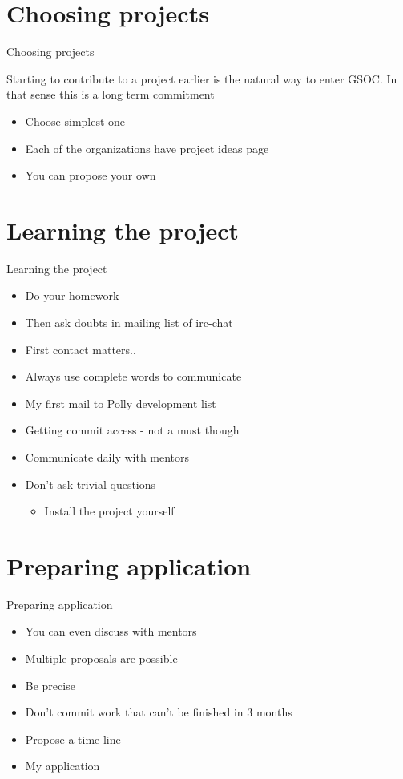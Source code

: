 \documentclass{beamer}
\begin{document}
\section{Choosing projects}
\begin{frame}{Choosing projects}
\begin{block}
{Starting to contribute to a project earlier is the natural way to enter GSOC.
In that sense this is a long term commitment}
\end{block}
\begin{itemize}
\item Choose simplest one
\item Each of the organizations have project ideas page
\item You can propose your own
\end{itemize}
\end{frame}

\section{Learning the project}
\begin{frame}{Learning the project}
\begin{itemize}
\item Do your homework
\pause
\item Then ask doubts in mailing list of irc-chat
\pause
\item First contact matters..
\pause
\item Always use complete words to communicate
\pause
\item My first mail to Polly development list
\pause
\item Getting commit access - not a must though
\pause
\item Communicate daily with mentors
\pause
\item Don't ask trivial questions
  \begin{itemize}
  \item Install the project yourself
  \end{itemize}
\end{itemize}
\end{frame}

\section{Preparing application}
\begin{frame}{Preparing application}
\begin{itemize}
\item You can even discuss with mentors
\pause
\item Multiple proposals are possible
\pause
\item Be precise
\pause
\item Don't commit work that can't be finished in 3 months
\pause
\item Propose a time-line
\pause
\item My application
\end{itemize}
\end{frame}
\end{document}

